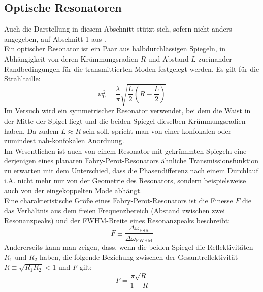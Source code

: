 \documentclass[11pt,a4paper,oneside]{scrartcl}
\begin{document}
\subsection{Optische Resonatoren}
Auch die Darstellung in diesem Abschnitt stützt sich, sofern nicht anders angegeben, auf Abschnitt 1 aus \cite{versuchsanleitung}. \\
Ein optischer Resonator ist ein Paar aus halbdurchlässigen Spiegeln, in Abhängigkeit von deren Krümmungsradien $R$ und Abstand $L$ zueinander Randbedingungen für die transmittierten Moden festgelegt werden. Es gilt für die Strahltaille:
\begin{equation}
w_0^2=\frac{\lambda}{\pi}\sqrt{\frac{L}{2}\left(R-\frac{L}{2}\right)}
\end{equation}
Im Versuch wird ein symmetrischer Resonator verwendet, bei dem die Waist in der Mitte der Spigel liegt und die beiden Spiegel dieselben Krümmungsradien haben. Da zudem $L\approx R$ sein soll, spricht man von einer konfokalen oder zumindest nah-konfokalen Anordnung.\\
Im Wesentlichen ist auch von einem Resonator mit gekrümmten Spiegeln eine derjenigen eines planaren Fabry-Perot-Resonators ähnliche Transmissionsfunktion zu erwarten mit dem Unterschied, dass die Phasendifferenz nach einem Durchlauf i.A. nicht mehr nur von der Geometrie des Resonators, sondern beispielsweise auch von der eingekoppelten Mode abhängt. \\
Eine charakteristische Größe eines Fabry-Perot-Resonators ist die Finesse $F$ die das Verhältnis aus dem freien Frequenzbereich (Abstand zwischen zwei Resonanzpeaks) und der FWHM-Breite eines Resonanzpeaks beschreibt:
\begin{equation}
F\equiv \frac{\Delta \omega_{\mathrm{FSR}}}{\Delta \omega_{\mathrm{FWHM}}}
\end{equation}
Andererseits kann man zeigen, dass, wenn die beiden Spiegel die Reflektivitäten $R_1$ und $R_2$ haben, die folgende Beziehung zwischen der Gesamtreflektivität $R\equiv \sqrt{R_1R_2}<1$ und $F$ gilt:
\begin{equation}\label{finesse_theor}
F= \frac{\pi\sqrt{R}}{1-R}
\end{equation}
\end{document}
